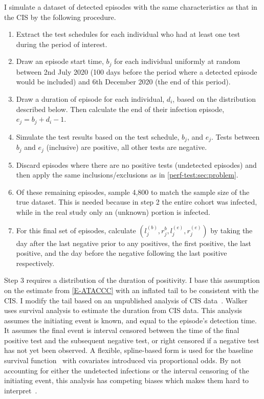 \documentclass[thesis.tex]{subfiles}
\begin{document}
I simulate a dataset of detected episodes with the same characteristics as that in the CIS by the following procedure.
\begin{enumerate}
    \item Extract the test schedules for each individual who had at least one test during the period of interest.
    \item Draw an episode start time, $b_{j}$ for each individual uniformly at random between 2nd July 2020 (100 days before the period where a detected episode would be included) and 6th December 2020 (the end of this period).
    \item Draw a duration of episode for each individual, $d_i$, based on the distribution described below. Then calculate the end of their infection episode, $e_{j} = b_{j} + d_i - 1$.
    \item Simulate the test results based on the test schedule, $b_{j}$, and $e_{j}$. Tests between $b_{j}$ and $e_{j}$ (inclusive) are positive, all other tests are negative.
    \item Discard episodes where there are no positive tests (\ie undetected episodes) and then apply the same inclusions/exclusions as in \cref{perf-test:sec:problem}.
    \item Of these remaining episodes, sample 4,800 to match the sample size of the true dataset. This is needed because in step 2 the entire cohort was infected, while in the real study only an (unknown) portion is infected.
    \item For this final set of episodes, calculate $(l_j^{(b)}, r_j^{b}, l_j^{(e)}, r_j^{(e)})$ by taking the day after the last negative prior to any positives, the first positive, the last positive, and the day before the negative following the last positive respectively.
\end{enumerate}

Step 3 requires a distribution of the duration of positivity.
I base this assumption on the estimate from \cref{E-ATACCC} with an inflated tail to be consistent with the CIS.
I modify the tail based on an unpublished analysis of CIS data~.
Walker uses survival analysis to estimate the duration from CIS data.
This analysis assumes the initiating event is known, and equal to the episode’s detection time. 
It assumes the final event is interval censored between the time of the final positive test and the subsequent negative test, or right censored if a negative test has not yet been observed.
A flexible, spline-based form is used for the baseline survival function~\autocite{roystonSTPM,roystonFlexible} with covariates introduced via proportional odds.
By not accounting for either the undetected infections or the interval censoring of the initiating event, this analysis has competing biases which makes them hard to interpret~\autocite{cisMethodsONS}.
\end{document}
